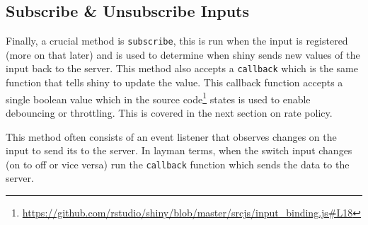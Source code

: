 \documentclass[10pt,]{krantz}
\renewcommand{\href}[2]{#2\footnote{\url{#1}}}
\begin{document}
\hypertarget{shiny-input-sub-unsub}{%
\subsection{Subscribe \& Unsubscribe Inputs}\label{shiny-input-sub-unsub}}

Finally, a crucial method is \texttt{subscribe}, this is run when the input is registered (more on that later) and is used to determine when shiny sends new values of the input back to the server. This method also accepts a \texttt{callback} which is the same function that tells shiny to update the value. This callback function accepts a single boolean value which in the \href{https://github.com/rstudio/shiny/blob/master/srcjs/input_binding.js\#L18}{source code} states is used to enable debouncing or throttling. This is covered in the next section on rate policy.

This method often consists of an event listener that observes changes on the input to send its to the server. In layman terms, when the switch input changes (on to off or vice versa) run the \texttt{callback} function which sends the data to the server.
\end{document}
